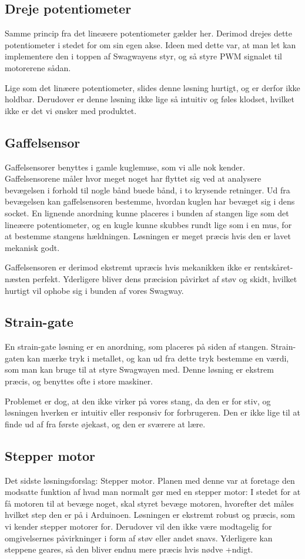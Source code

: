 \documentclass[a4paper,oneside,article,danish,table]{memoir}
\begin{document}
\subsection{Dreje potentiometer}
Samme princip fra det lineæere potentiometer gælder her. Derimod drejes dette potentiometer i stedet for om sin egen akse. Ideen med dette var, at man let kan implementere den i toppen af Swagwayens styr, og så styre PWM signalet til motorerene sådan. 

Lige som det linæere potentiometer, slides denne løsning hurtigt, og er derfor ikke holdbar. Derudover er denne løsning ikke lige så intuitiv og føles klodset, hvilket ikke er det vi ønsker med produktet.
\subsection{Gaffelsensor}
Gaffelsensorer benyttes i gamle kuglemuse, som vi alle nok kender. Gaffelsensorene måler hvor meget noget har flyttet sig ved at analysere bevægelsen i forhold til nogle bånd buede bånd, i to krysende retninger. Ud fra bevægelsen kan gaffelsensoren bestemme, hvordan kuglen har bevæget sig i dens socket. En lignende anordning kunne placeres i bunden af stangen lige som det lineæere potentiometer, og en kugle kunne skubbes rundt lige som i en mus, for at bestemme stangens hældningen. Løsningen er meget præcis hvis den er lavet mekanisk godt.

Gaffelsensoren er derimod ekstremt upræcis hvis mekanikken ikke er rentskåret-næsten perfekt. Yderligere bliver dens præcision påvirket af støv og skidt, hvilket hurtigt vil ophobe sig i bunden af vores Swagway.
\subsection{Strain-gate}
En strain-gate løsning er en anordning, som placeres på siden af stangen. Strain-gaten kan mærke tryk i metallet, og kan ud fra dette tryk bestemme en værdi, som man kan bruge til at styre Swagwayen med. Denne løsning er ekstrem præcis, og benyttes ofte i store maskiner.

Problemet er dog, at den ikke virker på vores stang, da den er for stiv, og løsningen hverken er intuitiv eller responsiv for forbrugeren. Den er ikke lige til at finde ud af fra første øjekast, og den er sværere at lære.
\subsection{Stepper motor}
Det sidste løsningsforslag: Stepper motor. Planen med denne var at foretage den modsatte funktion af hvad man normalt gør med en stepper motor: I stedet for at få motoren til at bevæge noget, skal styret bevæge motoren, hvorefter det måles hvilket step den er på i Arduinoen. Løsningen er ekstremt robust og præcis, som vi kender stepper motorer for. Derudover vil den ikke være modtagelig for omgivelsernes påvirkninger i form af støv eller andet snavs. Yderligere kan steppene geares, så den bliver endnu mere præcis hvis nødve
+ndigt.
\end{document}
